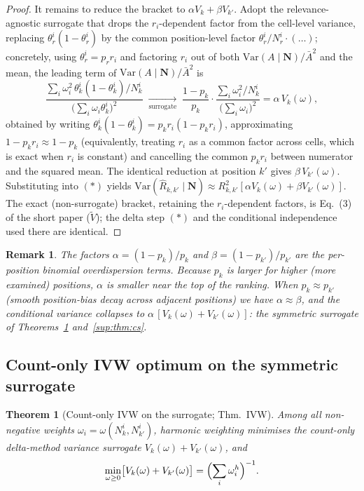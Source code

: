 \documentclass[11pt]{article}
\newtheorem{theorem}{Theorem}
\newtheorem{remark}{Remark}
\begin{document}
\begin{proof}
It remains to reduce the bracket to $\alpha V_k+\beta V_{k'}$. Adopt the
relevance-agnostic surrogate that drops the $r_i$-dependent factor from
the cell-level variance, replacing $\theta_r^i(1-\theta_r^i)$ by the
common position-level factor $\theta_r^i/N_r^i\cdot(\dots)$; concretely,
using $\theta_r^i=p_r r_i$ and factoring $r_i$ out of both
$\mathrm{Var}(A\mid\mathbf N)/\bar A^2$ and the mean, the leading term of
$\mathrm{Var}(A\mid\mathbf N)/\bar A^2$ is
\[
\frac{\sum_i\omega_i^2\,\theta_k^i(1-\theta_k^i)/N_k^i}{\bigl(\sum_i\omega_i\theta_k^i\bigr)^2}
\;\xrightarrow[\text{surrogate}]{}\;
\frac{1-p_k}{p_k}\cdot
\frac{\sum_i\omega_i^2/N_k^i}{\bigl(\sum_i\omega_i\bigr)^2}
=\alpha\,V_k(\omega),
\]
obtained by writing $\theta_k^i(1-\theta_k^i)=p_kr_i(1-p_kr_i)$,
approximating $1-p_kr_i\approx 1-p_k$ (equivalently, treating $r_i$ as a
common factor across cells, which is exact when $r_i$ is constant) and
cancelling the common $p_k r_i$ between numerator and the squared mean.
The identical reduction at position $k'$ gives $\beta\,V_{k'}(\omega)$.
Substituting into $(\ast)$ yields
$\mathrm{Var}(\hat R_{k,k'}\mid\mathbf N)\approx
R_{k,k'}^2[\alpha V_k(\omega)+\beta V_{k'}(\omega)]$.
The exact (non-surrogate) bracket, retaining the $r_i$-dependent factors,
is Eq.~(3) of the short paper ($\widetilde V$); the delta step
$(\ast)$ and the conditional independence used there are identical.
\end{proof}

\begin{remark}
The factors $\alpha=(1-p_k)/p_k$ and $\beta=(1-p_{k'})/p_{k'}$ are the
per-position binomial overdispersion terms. Because $p_k$ is larger for
higher (more examined) positions, $\alpha$ is smaller near the top of the
ranking. When $p_k\approx p_{k'}$ (smooth position-bias decay across
adjacent positions) we have $\alpha\approx\beta$, and the conditional
variance collapses to $\alpha\,[V_k(\omega)+V_{k'}(\omega)]$: the
\emph{symmetric surrogate} of Theorems~\ref{sup:thm:ivw}
and~\ref{sup:thm:cs}.
\end{remark}

\subsection{Count-only IVW optimum on the symmetric surrogate}

\begin{theorem}[Count-only IVW on the surrogate; Thm.~IVW]
\label{sup:thm:ivw}
Among all non-negative weights $\omega_i=\omega(N_k^i,N_{k'}^i)$,
harmonic weighting minimises the count-only delta-method variance
surrogate $V_k(\omega)+V_{k'}(\omega)$, and
\[
\min_{\omega\ge 0}\bigl[V_k(\omega)+V_{k'}(\omega)\bigr]
=\Bigl(\sum_i\omega_i^h\Bigr)^{-1}.
\]
\end{theorem}
\end{document}
